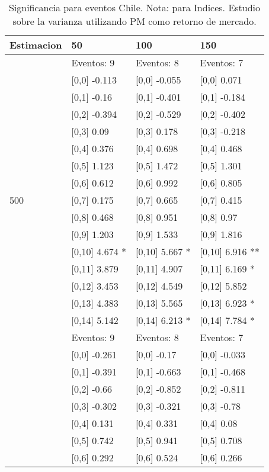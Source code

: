 \begin{table}

\caption{Significancia para eventos Chile. Nota: para Indices. Estudio sobre la varianza utilizando PM como retorno de mercado.}
\centering
\begin{tabular}[t]{llll}
\toprule
Estimacion & 50 & 100 & 150\\
\midrule
 & Eventos:  9 & Eventos:  8 & Eventos:  7\\
 & {}[0,0] -0.113 & {}[0,0] -0.055 & {}[0,0] 0.071\\
 & {}[0,1] -0.16 & {}[0,1] -0.401 & {}[0,1] -0.184\\
 & {}[0,2] -0.394 & {}[0,2] -0.529 & {}[0,2] -0.402\\
 & {}[0,3] 0.09 & {}[0,3] 0.178 & {}[0,3] -0.218\\
\addlinespace
 & {}[0,4] 0.376 & {}[0,4] 0.698 & {}[0,4] 0.468\\
 & {}[0,5] 1.123 & {}[0,5] 1.472 & {}[0,5] 1.301\\
 & {}[0,6] 0.612 & {}[0,6] 0.992 & {}[0,6] 0.805\\
500 & {}[0,7] 0.175 & {}[0,7] 0.665 & {}[0,7] 0.415\\
 & {}[0,8] 0.468 & {}[0,8] 0.951 & {}[0,8] 0.97\\
\addlinespace
 & {}[0,9] 1.203 & {}[0,9] 1.533 & {}[0,9] 1.816\\
 & {}[0,10] 4.674 * & {}[0,10] 5.667 * & {}[0,10] 6.916 **\\
 & {}[0,11] 3.879 & {}[0,11] 4.907 & {}[0,11] 6.169 *\\
 & {}[0,12] 3.453 & {}[0,12] 4.549 & {}[0,12] 5.852\\
 & {}[0,13] 4.383 & {}[0,13] 5.565 & {}[0,13] 6.923 *\\
\addlinespace
 & {}[0,14] 5.142 & {}[0,14] 6.213 * & {}[0,14] 7.784 *\\
 & Eventos:  9 & Eventos:  8 & Eventos:  7\\
 & {}[0,0] -0.261 & {}[0,0] -0.17 & {}[0,0] -0.033\\
 & {}[0,1] -0.391 & {}[0,1] -0.663 & {}[0,1] -0.468\\
 & {}[0,2] -0.66 & {}[0,2] -0.852 & {}[0,2] -0.811\\
\addlinespace
 & {}[0,3] -0.302 & {}[0,3] -0.321 & {}[0,3] -0.78\\
 & {}[0,4] 0.131 & {}[0,4] 0.331 & {}[0,4] 0.08\\
 & {}[0,5] 0.742 & {}[0,5] 0.941 & {}[0,5] 0.708\\
 & {}[0,6] 0.292 & {}[0,6] 0.524 & {}[0,6] 0.266\\

\end{tabular}
\end{table}
